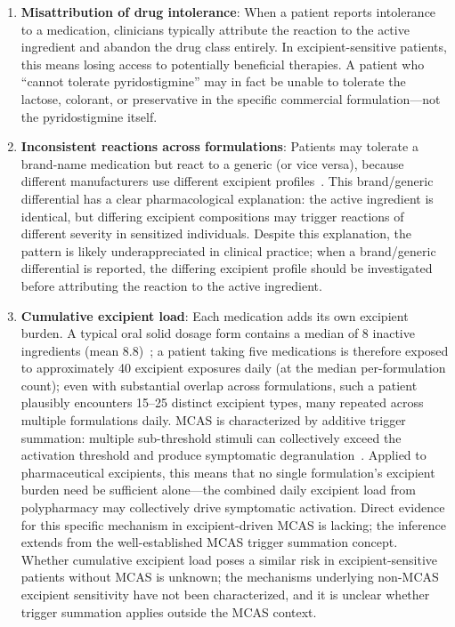 \begin{enumerate}
    \item \textbf{Misattribution of drug intolerance}: When a patient reports intolerance to a medication, clinicians typically attribute the reaction to the active ingredient and abandon the drug class entirely. In excipient-sensitive patients, this means losing access to potentially beneficial therapies. A patient who ``cannot tolerate pyridostigmine'' may in fact be unable to tolerate the lactose, colorant, or preservative in the specific commercial formulation---not the pyridostigmine itself.

    \item \textbf{Inconsistent reactions across formulations}: Patients may tolerate a brand-name medication but react to a generic (or vice versa), because different manufacturers use different excipient profiles~\cite{Reker2019excipients}. This brand/generic differential has a clear pharmacological explanation: the active ingredient is identical, but differing excipient compositions may trigger reactions of different severity in sensitized individuals. Despite this explanation, the pattern is likely underappreciated in clinical practice; when a brand/generic differential is reported, the differing excipient profile should be investigated before attributing the reaction to the active ingredient.

    \item \textbf{Cumulative excipient load}: Each medication adds its own excipient burden. A typical oral solid dosage form contains a median of 8 inactive ingredients (mean 8.8)~\cite{Reker2019excipients}; a patient taking five medications is therefore exposed to approximately 40 excipient exposures daily (at the median per-formulation count); even with substantial overlap across formulations, such a patient plausibly encounters 15--25 distinct excipient types, many repeated across multiple formulations daily. MCAS is characterized by additive trigger summation: multiple sub-threshold stimuli can collectively exceed the activation threshold and produce symptomatic degranulation~\cite{Molderings2011,Afrin2016}. Applied to pharmaceutical excipients, this means that no single formulation's excipient burden need be sufficient alone---the combined daily excipient load from polypharmacy may collectively drive symptomatic activation. Direct evidence for this specific mechanism in excipient-driven MCAS is lacking; the inference extends from the well-established MCAS trigger summation concept. Whether cumulative excipient load poses a similar risk in excipient-sensitive patients without MCAS is unknown; the mechanisms underlying non-MCAS excipient sensitivity have not been characterized, and it is unclear whether trigger summation applies outside the MCAS context.


\end{enumerate}
